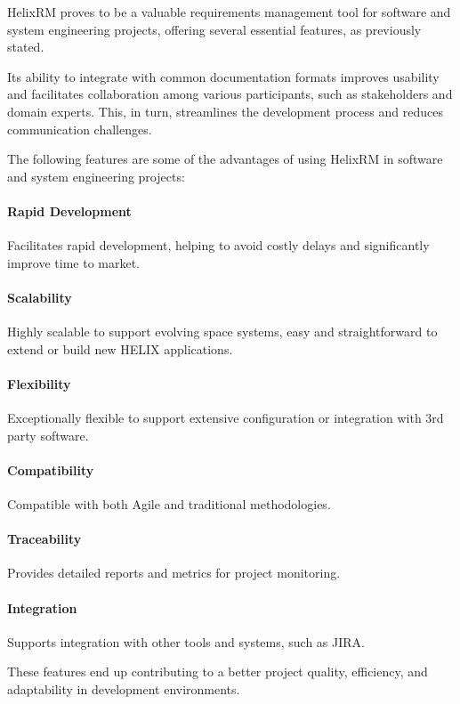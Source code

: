 
HelixRM proves to be a valuable requirements management tool for software
and system engineering projects, offering several essential features, as
previously stated.

Its ability to integrate with common documentation formats improves
usability and facilitates collaboration among various participants,
such as stakeholders and domain experts.
This, in turn, streamlines the development process and reduces communication challenges\cite{michele_zamparelli_2006}.


The following features are some of the advantages of using HelixRM in software and system engineering projects:

\paragraph{Rapid Development}
Facilitates rapid development, helping to avoid costly delays and significantly improve time to market\footnotemark[1].

\paragraph{Scalability}
Highly scalable to support evolving space systems, easy and straightforward to extend or build new HELIX applications\footnotemark[1].

\paragraph{Flexibility}
Exceptionally flexible to support extensive configuration or integration with 3rd party software\footnotemark[1].

\paragraph{Compatibility}
Compatible with both Agile and traditional methodologies\footnotemark[2].

\paragraph{Traceability}
Provides detailed reports and metrics for project monitoring\footnotemark[2].

\paragraph{Integration}
Supports integration with other tools and systems, such as JIRA\footnotemark[2].

These features end up contributing to a better project quality,
efficiency, and adaptability in development environments\cite{youngki_hong__2010}.







